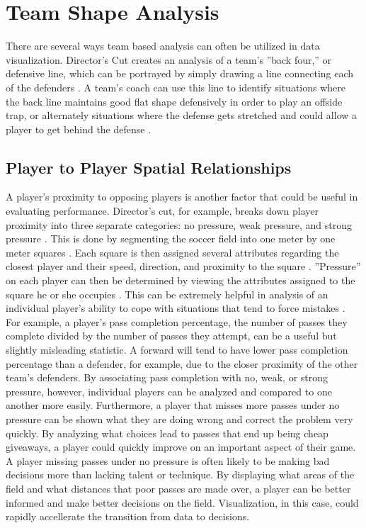 \documentclass[sigconf]{acmart}
\begin{document}
{\section{Team Shape Analysis}

There are several ways team based analysis can often be utilized in data visualization. Director’s Cut creates an analysis of a team’s ''back four,'' or defensive line, which can be portrayed by simply drawing a line connecting each of the defenders \cite{directorscut}. A team’s coach can use this line to identify situations where the back line maintains good flat shape defensively in order to play an offside trap, or alternately situations where the defense gets stretched and could allow a player to get behind the defense \cite{directorscut}.

\subsection{Player to Player Spatial Relationships}

A player’s proximity to opposing players is another factor that could be useful in evaluating performance. Director’s cut, for example, breaks down player proximity into three separate categories: no pressure, weak pressure, and strong pressure \cite{directorscut}. This is done by segmenting the soccer field into one meter by one meter squares \cite{directorscut}. Each square is then assigned several attributes regarding the closest player and their speed, direction, and proximity to the square \cite{directorscut}. ''Pressure'' on each player can then be determined by viewing the attributes assigned to the square he or she occupies \cite{directorscut}. This can be extremely helpful in analysis of an individual player’s ability to cope with situations that tend to force mistakes \cite{directorscut}. For example, a player’s pass completion percentage, the number of passes they complete divided by the number of passes they attempt, can be a useful but slightly misleading statistic. A forward will tend to have lower pass completion percentage than a defender, for example, due to the closer proximity of the other team’s defenders. By associating pass completion with no, weak, or strong pressure, however, individual players can be analyzed and compared to one another more easily. Furthermore, a player that misses more passes under no pressure can be shown what they are doing wrong and correct the problem very quickly. By analyzing what choices lead to passes that end up being cheap giveaways, a player could quickly improve on an important aspect of their game. A player missing passes under no pressure is often likely to be making bad decisions more than lacking talent or technique. By displaying what areas of the field and what distances that poor passes are made over, a player can be better informed and make better decisions on the field. Visualization, in this case, could rapidly accellerate the transition from data to decisions.

}
\end{document}
